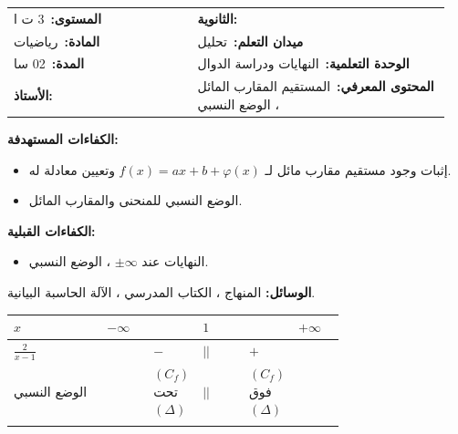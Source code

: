 \documentclass[12pt,a4paper]{article}
\makeatletter
\newenvironment{LTR}{\begin{otherlanguage}{english}}{\end{otherlanguage}}
\newcommand{\ar}[1]{\foreignlanguage{arabic}{#1}}
\newcommand{\Phase}[1]{\textbf{#1}}
\newcommand{\Fld}[2]{\textbf{#1:}\ #2}
\newcommand{\ModhHead}[9]{%
\begin{LTR}
\begin{tcolorbox}[enhanced,colback=white,colframe=cThm!85!black,arc=4mm,boxrule=1pt,top=14pt,bottom=6pt,left=8pt,right=8pt,
 overlay={\node[fill=cThm!85!black,text=white,rounded corners=3mm,inner xsep=14pt,inner ysep=4pt,font=\large\bfseries] at ([yshift=0pt]frame.north){\ar{مذكرة رقم #1}};},
 before upper={\selectlanguage{arabic}}]
\begin{tabular}{@{}p{0.4\linewidth}p{0.55\linewidth}@{}}
\Fld{المستوى}{#2} & \Fld{الثانوية}{\dotfill}\\[3pt]
\Fld{المادة}{رياضيات} & \Fld{ميدان التعلم}{#3}\\[3pt]
\Fld{المدة}{#5} & \Fld{الوحدة التعلمية}{#4}\\[3pt]
\Fld{الأستاذ}{\dotfill} & \Fld{المحتوى المعرفي}{#6}\\
\end{tabular}
\end{tcolorbox}
\begin{tcolorbox}[enhanced,colback=white,colframe=cThm!85!black,arc=3mm,boxrule=0.8pt,sidebyside,sidebyside align=top,lefthand ratio=0.5,
 segmentation style={dashed,cThm!60},before upper={\selectlanguage{arabic}},before lower={\selectlanguage{arabic}}]
\textbf{الكفاءات المستهدفة:}\par #8
\tcblower
\textbf{الكفاءات القبلية:}\par #7
\end{tcolorbox}
\end{LTR}
\par\smallskip\textbf{الوسائل:} #9\par\smallskip}
\newenvironment{Sayr}{%
\begin{LTR}\renewcommand{\arraystretch}{1.25}\setlength{\tabcolsep}{4pt}\relpenalty=10000\binoppenalty=10000\tolerance=9000\emergencystretch=0.3\linewidth
\begin{longtable}{|p{0.09\textwidth}|>{\centering\arraybackslash}p{0.05\textwidth}|p{0.71\textwidth}|>{\centering\arraybackslash}p{0.09\textwidth}|}
\hline\rowcolor{cThm!12}\ar{\footnotesize\textbf{توجيهات وتعاليق}} & \ar{\footnotesize\textbf{المدة}} & \ar{\textbf{سير الحصة}} & \ar{\footnotesize\textbf{مراحل الحصة}}\\\hline\endhead
\hline\endfoot}{\end{longtable}\end{LTR}}
\newcommand{\Row}[4]{\ar{\small #4} & \ar{#3} & \ar{#2} & \cellcolor{cThm!8}\ar{\Phase{#1}}\\\hline}
\newcommand{\Lab}[2]{\foreignlanguage{english}{\tcbox[on line,colback=#1,colframe=#1,boxrule=0pt,arc=2pt,boxsep=1pt,left=5pt,right=5pt,top=1pt,bottom=1pt]{\ar{\textcolor{white}{\textbf{#2}}}}}}
\newcommand{\RR}[1]{\ifmmode{\color{cThm}#1}\else$\mbox{\color{cThm}#1}$\fi}
\makeatother
\begin{document}
\newpage
\ModhHead{19}{3 ت ا}{تحليل}{النهايات ودراسة الدوال}{02 سا}{المستقيم المقارب المائل ، الوضع النسبي}%
{\begin{itemize}\item النهايات عند $\pm\infty$ ، الوضع النسبي.\end{itemize}}%
{\begin{itemize}\item إثبات وجود مستقيم مقارب مائل لـ $f(x)=ax+b+\varphi(x)$ وتعيين معادلة له.\item الوضع النسبي للمنحنى والمقارب المائل.\end{itemize}}%
{المنهاج ، الكتاب المدرسي ، الآلة الحاسبة البيانية.}
\begin{Sayr}
\Row{مرحلة الانطلاق}{%
\textbf{التهيئة النفسية:} منحنى $x+\dfrac1x$ بالحاسبة البيانية: إلى أي مستقيم «يلتصق»؟}{10 د}{الحاسبة البيانية.}
\Row{التشخيص والاكتشاف}{%
\Lab{cEx}{نشاط 05}\ $f(x)=\dfrac{2x^2-3x+3}{x-1}$ على $\mathbb R-\{1\}$.\par\textbf{(1)} عيّن $a$ ، $b$ ، $c$ بحيث $f(x)=ax+b+\dfrac c{x-1}$.\par\textbf{(2)} احسب $\lim\limits_{x\to \pm\infty}\big[f(x)-(2x-1)\big]$.}{35 د}{المطابقة خطوة خطوة.}
\Row{}{%
\Lab{cDef}{مناقشة النشاط}\par\textbf{(1)} $ax+b+\dfrac c{x-1}=\dfrac{ax^2+(b-a)x-b+c}{x-1}$. بالمطابقة: $a=2$ ؛ $b-a=-3$ ومنه $b=-1$ ؛ $-b+c=3$ ومنه $c=2$: $\RR{f(x)=2x-1+\dfrac2{x-1}}$.\par\textbf{(2)} $f(x)-(2x-1)=\dfrac2{x-1}\to\RR{0}$: المسافة الشاقولية بين $(C_f)$ والمستقيم $y=2x-1$ تنعدم.}{}{}
\Row{بناء المعارف}{%
\Lab{cDef}{تعريف}\ المستقيم $y=ax+b$ \textbf{مقارب مائل} لـ $(C_f)$ بجوار $+\infty$ إذا كان $\RR{\lim\limits_{x\to +\infty}\big[f(x)-(ax+b)\big]=0}$ (وبالمثل عند $-\infty$).}{50 د}{جدول الإشارة.}
\Row{}{%
\Lab{cThm}{خاصية}\ إذا كان $f(x)=ax+b+\varphi(x)$ مع $\varphi(x)\to0$ فإن $\RR{y=ax+b}$ مقارب مائل.}{}{}
\Row{}{%
\Lab{cMeth}{الوضع النسبي}\ ندرس إشارة $f(x)-(ax+b)=\varphi(x)$:\par\smallskip\begin{LTR}\centering {\renewcommand{\arraystretch}{1.6}\setlength{\tabcolsep}{1pt}\begin{tabular}{|>{\centering\arraybackslash}p{0.240\linewidth}|>{\centering\arraybackslash}p{0.144\linewidth}>{\centering\arraybackslash}p{0.144\linewidth}>{\centering\arraybackslash}p{0.144\linewidth}>{\centering\arraybackslash}p{0.144\linewidth}>{\centering\arraybackslash}p{0.144\linewidth}|}\hline\rowcolor{cSec!12}$x$ & $-\infty$ &  & $1$ &  & $+\infty$\\\hline $\frac2{x-1}$ &  & $-$ & $||$ & $+$ & \\\hline \ar{الوضع النسبي} &  & \ar{$(C_f)$ تحت $(\Delta)$} & $||$ & \ar{$(C_f)$ فوق $(\Delta)$} & \\\hline \end{tabular}}\end{LTR}\par }{}{}

\end{Sayr}
\end{document}
